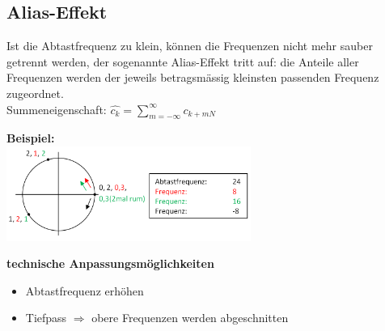 	
	
	
\subsection{Alias-Effekt }

	Ist die Abtastfrequenz zu klein, k\"onnen die Frequenzen nicht mehr sauber getrennt werden, der sogenannte Alias-Effekt tritt auf:
	die Anteile aller Frequenzen werden der jeweils betragsm\"assig kleinsten passenden Frequenz zugeordnet.\\
	Summeneigenschaft: \qquad $\boxed{\hat{c_k} = \sum\limits_{m=-\infty}^{\infty} c_{k+mN}}$\\
	\begin{minipage}[t]{8.5cm}
        \textbf{Beispiel:}\\
		\includegraphics[width=8cm]{./bilder/Alias-effekt.png}
	\end{minipage}
	\qquad
	\begin{minipage}[t]{10cm}
		\textbf{technische Anpassungsmöglichkeiten}\\
		\begin{itemize}
			\item Abtastfrequenz erhöhen
			\item Tiefpass $\Rightarrow$ obere Frequenzen werden abgeschnitten
		\end{itemize}
	\end{minipage}
	
